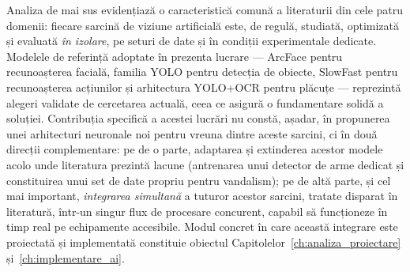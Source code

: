\documentclass[../../main.tex]{subfiles}
\begin{document}
Analiza de mai sus evidențiază o caracteristică comună a literaturii din cele patru domenii: fiecare sarcină de viziune artificială este, de regulă, studiată, optimizată și evaluată \emph{în izolare}, pe seturi de date și în condiții experimentale dedicate. Modelele de referință adoptate în prezenta lucrare --- ArcFace pentru recunoașterea facială, familia YOLO pentru detecția de obiecte, SlowFast pentru recunoașterea acțiunilor și arhitectura YOLO+OCR pentru plăcuțe --- reprezintă alegeri validate de cercetarea actuală, ceea ce asigură o fundamentare solidă a soluției. Contribuția specifică a acestei lucrări nu constă, așadar, în propunerea unei arhitecturi neuronale noi pentru vreuna dintre aceste sarcini, ci în două direcții complementare: pe de o parte, adaptarea și extinderea acestor modele acolo unde literatura prezintă lacune (antrenarea unui detector de arme dedicat și constituirea unui set de date propriu pentru vandalism); pe de altă parte, și cel mai important, \emph{integrarea simultană} a tuturor acestor sarcini, tratate disparat în literatură, într-un singur flux de procesare concurent, capabil să funcționeze în timp real pe echipamente accesibile. Modul concret în care această integrare este proiectată și implementată constituie obiectul Capitolelor~\ref{ch:analiza_proiectare} și~\ref{ch:implementare_ai}.
\end{document}
